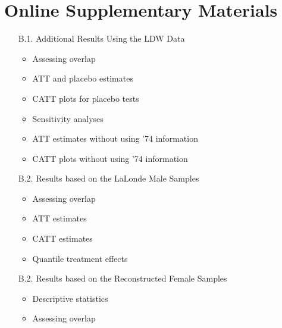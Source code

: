 \documentclass[letterpaper,12pt,leqno]{article}
\begin{document}
\onehalfspacing
\setcounter{page}{1}
\setcounter{table}{0}
\setcounter{figure}{0}
\setcounter{equation}{0}
\setcounter{footnote}{0}
\renewcommand\thetable{B\arabic{table}}
\renewcommand\thefigure{B\arabic{figure}}
\renewcommand{\thepage}{B-\arabic{page}}
\renewcommand{\theequation}{B\arabic{equation}}
\renewcommand{\thefootnote}{B\arabic{footnote}}

\vspace{0em}
\section{Online Supplementary Materials}
\bigskip


\noindent{}

{\small
\begin{enumerate}\itemsep0.5em
    \item[B.1.] Additional Results Using the LDW Data
    \vspace{-0.5em}
    \begin{itemize}
        \item Assessing overlap
        \item ATT and placebo estimates
        \item CATT plots for placebo tests
        \item Sensitivity analyses
        \item ATT estimates without using '74 information
        \item CATT plots without using '74 information
    \end{itemize}
    \item[B.2.] Results based on the LaLonde Male Samples
    \vspace{-0.5em}
    \begin{itemize}
        \item Assessing overlap
        \item ATT estimates
        \item CATT estimates
        \item Quantile treatment effects
    \end{itemize}
    \item[B.2.] Results based on the Reconstructed Female Samples
    \vspace{-0.5em}
    \begin{itemize}
        \item Descriptive statistics
        \item Assessing overlap

\end{itemize}
\end{enumerate}}
\end{document}
